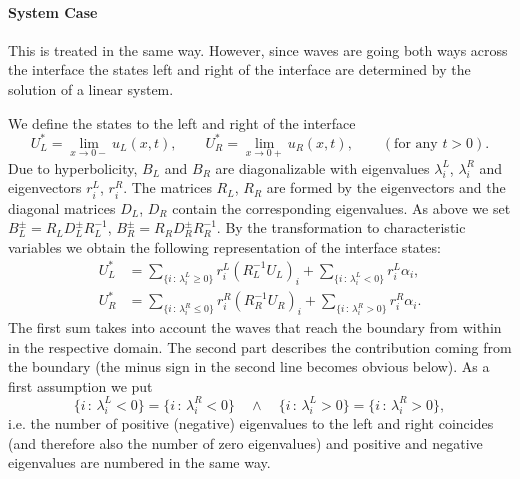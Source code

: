 \documentclass[a4paper,12pt]{article}
\theoremstyle{definition}
\theoremstyle{definition}
\begin{document}
\paragraph{System Case} This is treated in the same way. However, since waves are going
both ways across the interface the states left and right of the interface are determined by the
solution of a linear system. 

We define the states to the left and right of the interface
\begin{equation*}
U_L^\ast = \lim_{x\to 0-} u_L(x,t), \qquad 
U_R^\ast = \lim_{x\to 0+} u_R(x,t), \qquad 
(\text{for any $t>0$}) .
\end{equation*}
Due to hyperbolicity, $B_L$ and $B_R$ are diagonalizable with 
eigenvalues $\lambda_i^L$, $\lambda_i^R$ and eigenvectors $r_i^L$, $r_i^R$.
The matrices $R_L$, $R_R$ are formed by the eigenvectors and the diagonal
matrices $D_L$, $D_R$ contain the corresponding eigenvalues. As above we set
$B_L^\pm = R_LD_L^\pm R_L^{-1}$, $B_R^\pm = R_RD_R^\pm R_R^{-1}$.
By the transformation to characteristic variables we obtain the following representation
of the interface states:
\begin{align}
U_L^\ast &= \sum_{\{i \,:\, \lambda_i^L\geq 0\}} r_i^L (R_L^{-1} U_L)_i + \sum_{\{i \,:\, \lambda_i^L<0\}} r_i^L \alpha_i,\\
U_R^\ast &= \sum_{\{i \,:\, \lambda_i^R\leq 0\}} r_i^R (R_R^{-1} U_R)_i + \sum_{\{i \,:\, \lambda_i^R>0\}} r_i^R \alpha_i.
\end{align}
The first sum takes into account the waves that reach the boundary from within in the respective domain.
The second part describes the contribution coming from the boundary (the minus sign in the second line
becomes obvious below).
As a first assumption we put
\begin{equation}
\{i \,:\, \lambda_i^L < 0\} = \{i \,:\, \lambda_i^R < 0\} \quad\wedge\quad
\{i \,:\, \lambda_i^L > 0\} = \{i \,:\, \lambda_i^R > 0\},
\end{equation}
i.e. the number of positive (negative) eigenvalues to the left and right coincides
(and therefore also the number of zero eigenvalues) and positive
and negative eigenvalues are numbered in the same way.
\end{document}
